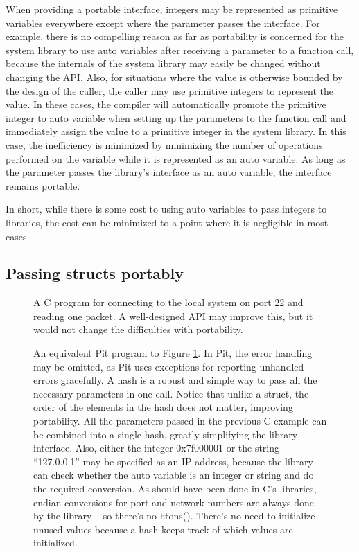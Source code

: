 When providing a portable interface, integers may be represented as primitive variables everywhere except where the
parameter passes the interface.  For example,
there is no compelling reason as far as portability is concerned for the system library to use auto variables after receiving
a parameter to a function call, because the internals of the system library may easily be changed without changing
the API.  Also, for situations where the value is otherwise bounded by the design of the caller, the caller may use primitive
integers to represent the value.  In these cases, the compiler will automatically promote the primitive integer to auto
variable when setting up the parameters to the function call and immediately assign the value to a primitive integer in the system
library.  In this case, the inefficiency is minimized by minimizing the number of operations performed on the
variable while it is represented as an auto variable.  As long as the parameter passes the library's interface as an auto variable, the interface remains
portable.

In short, while there is some cost to using auto variables to pass integers to libraries, the cost can be minimized to a point
where it is negligible in most cases.

\subsection{Passing structs portably}

\begin{figure}[htb]  %
	\caption{
		A C program for connecting to the local system on port 22 and reading one packet.  A well-designed API may
		improve this, but it would not change the difficulties with portability.
	}
	\label{example_portability_network.c}
\end{figure}
\begin{figure}[htb]
	\caption{
		An equivalent Pit program to Figure \ref{example_portability_network.c}.  In Pit, the error handling may be omitted, as
		Pit uses exceptions for reporting unhandled
		errors gracefully.  A hash is a robust and simple way to pass all the necessary parameters in one call.  Notice that
		unlike a struct, the order of the elements in the hash does not matter, improving portability.  All the parameters
		passed in the previous C example can be combined into a single hash, greatly simplifying the library interface.  Also,
		either the integer 0x7f000001 or the string ``127.0.0.1'' may be specified as an IP address, because the library can
		check whether the auto variable is an integer or string and do the required conversion.  As should have been done in
		C's libraries, endian conversions for port and network numbers are always done by the library -- so there's no htons().
		There's no need to initialize unused values because a hash keeps track of which values are initialized.
	}
	\label{example_portability_network.p}
\end{figure}

